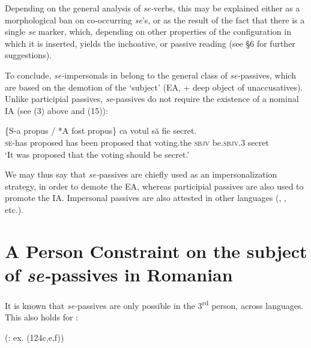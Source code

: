\documentclass[output=paper]{langsci/langscibook}
\begin{document}
Depending on the general analysis of \textit{se-}verbs, this may be explained either as a morphological ban on co-occurring \textit{se}’s, or as the result of the fact that there is a single \textit{se} marker, which, depending on other properties of the configuration in which it is inserted, yields the inchoative,  or passive reading (see §6 for further suggestions).

  To conclude, \textit{se-}impersonals in  belong to the general class of \textit{se-}passives, which are based on the demotion of the ‘subject' (EA, + deep object of unaccusatives). Unlike participial passives, \textit{se}{}-passives do not require the existence of a nominal IA (see (3) above and (15)):

\ea%
    \label{ex:giurgea:15}
    \gll \{S-a      propus    / *A   fost   propus\}   ca   votul          să     fie           secret.\\
         \textsc{se-}has proposed {}   has been proposed that voting.the \textsc{sbjv} be.\textsc{sbjv.3} secret\\
    \glt ‘It was proposed that the voting should be secret.’
    \z

          

We may thus say that \textit{se-}passives are chiefly used as an impersonalization strategy, in order to demote the EA, whereas participial passives are also used to promote the IA. Impersonal passives are also attested in other languages (, , etc.).

\section{A Person Constraint on the subject of \textit{se-}passives in Romanian}%

It is known that \textit{se-}passives are only possible in the 3\textsuperscript{rd} person, across  languages. This also holds for :

\ea%
    (\citealt{Dobrovie-Sorin2017}: ex. (124c,e,f))\label{ex:giurgea:16}\\
    \z
\z
\end{document}
